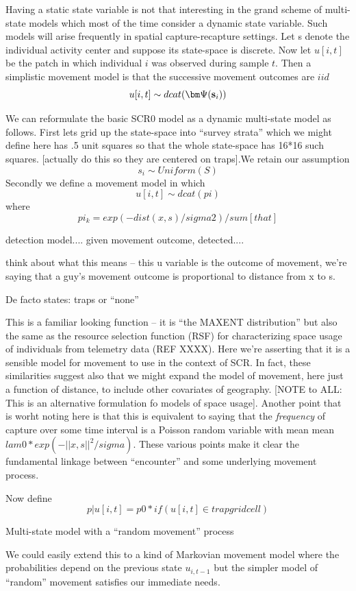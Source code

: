 Having a static state variable is not that interesting in the grand
scheme of multi-state models which most of the time consider a dynamic
state variable. Such models will arise frequently in spatial
capture-recapture settings. Let s denote the individual activity
center and suppose its state-space is discrete.  Now let $u[i,t]$ be
the patch in which individual $i$ was observed during sample $t$. Then
a simplistic movement model is that the successive movement outcomes
are $iid$
\[
u[i,t] \sim  dcat( {\bm \Psi}({\bf s}_{i}) )
\]

We can reformulate the basic SCR0 model as a dynamic multi-state model
as follows.  First lets grid up the state-space into “survey strata”
which we might define here has .5 unit squares so that the whole
state-space has 16*16 such squares. [actually do this so they are
centered on traps].We retain our assumption
\[
 s_{i} \sim Uniform(S)
\]
Secondly we define a movement model in which
\[
u[i,t] \sim dcat(pi)
\]
where
\[
 pi_{k} = exp(-dist(x,s)/sigma2)/sum[that]
\]

detection model....
given movement outcome, detected....


think about what this means -- this u variable is the outcome of movement,
we're saying that a guy's movement outcome is proportional to distance
from x to s. 

De facto states: traps or ``none''


This is a familiar looking function -- it is ``the MAXENT
distribution'' but also the same as the resource selection function (RSF)
for characterizing space usage of individuals from telemetry data (REF XXXX).
Here we're asserting that it is a sensible model for movement to use in 
the context of SCR. In fact, these similarities suggest also that we might
expand the model of movement, here just a function of distance, to include
other covariates of geography. [NOTE to ALL: This is an alternative
formulation fo models of space usage]. 
Another point that is worht noting here is that this is equivalent to saying
that the {\it frequency} of capture over some time interval is a Poisson
random variable with mean
mean $lam0*exp(-||x,s||^2/sigma)$.  These   various points
make it clear the fundamental linkage between ``encounter'' and some
underlying movement process.


Now define
\[
 p|u[i,t] = p0*if(u[i,t] \in trap grid cell)
\]

Multi-state model with a ``random movement'' process


We could easily extend this to a kind of Markovian movement model
where the probabilities depend on the previous state $u_{i,t-1}$ but
the simpler model of ``random'' movement satisfies our immediate needs.
 
